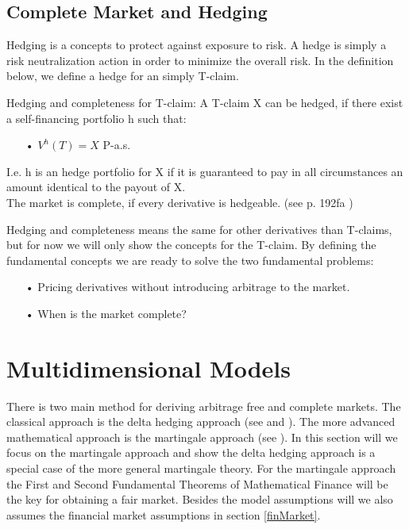 
\subsection{Complete Market and Hedging}
Hedging is a concepts to protect against exposure to risk. A hedge is simply a risk neutralization action in order to minimize the overall risk. In the definition below, we define a hedge for an simply T-claim.
\theoremstyle{definition}
\begin{definition}{Hedging and completeness for T-claim:}
A T-claim X can be hedged, if there exist a self-financing portfolio h such that:
\begin{enumerate}
\item[•] $V^{h}(T)=X$ P-a.s.
\end{enumerate}
I.e. h is an hedge portfolio for X if it is guaranteed to pay in all circumstances an amount identical to the payout of X.\\
The market is complete, if every derivative is hedgeable.
(see p. 192fa \parencite{finKont})
\end{definition}
Hedging and completeness means the same for other derivatives than T-claims, but for now we will only show the concepts for the T-claim. By defining the fundamental concepts we are ready to solve the two fundamental problems:
\begin{enumerate}
\item[•] Pricing derivatives without introducing arbitrage to the market.
\item[•] When is the market complete?
\end{enumerate}


\section{Multidimensional Models}\label{MultiDimModel}
There is two main method for deriving arbitrage free and complete markets. The classical approach is the delta hedging approach (see \parencite{B-S-Paper} and \parencite{CRR}). The more advanced mathematical approach is the martingale approach (see \parencite{finKont}). In this section will we focus on the martingale approach and show the delta hedging approach is a special case of the more general martingale theory. For the martingale approach the First and Second Fundamental Theorems of Mathematical Finance will be the key for obtaining a fair market. Besides the model assumptions will we also assumes the financial market assumptions in section \ref{finMarket}.

